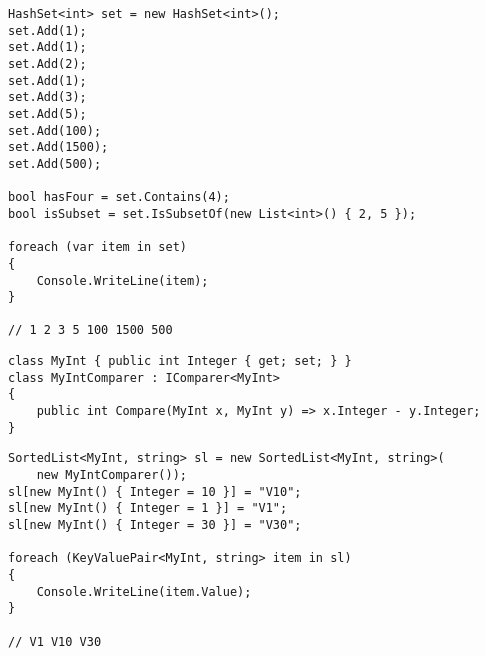 \begin{frame}[fragile]
\begin{yesblock}
\begin{lstlisting}[deletekeywords={set}]
HashSet<int> set = new HashSet<int>();
set.Add(1);
set.Add(1);
set.Add(2);
set.Add(1);
set.Add(3);
set.Add(5);
set.Add(100);
set.Add(1500);
set.Add(500);

bool hasFour = set.Contains(4);
bool isSubset = set.IsSubsetOf(new List<int>() { 2, 5 });

foreach (var item in set)
{
    Console.WriteLine(item);
}

// 1 2 3 5 100 1500 500
\end{lstlisting}
\end{yesblock}
\end{frame}


\begin{frame}[fragile]
\begin{yesblock}
\begin{lstlisting}
class MyInt { public int Integer { get; set; } }
class MyIntComparer : IComparer<MyInt>
{
    public int Compare(MyInt x, MyInt y) => x.Integer - y.Integer;
}
\end{lstlisting}
\end{yesblock}
\vfill
\begin{yesblock}
\begin{lstlisting}
SortedList<MyInt, string> sl = new SortedList<MyInt, string>(
    new MyIntComparer());
sl[new MyInt() { Integer = 10 }] = "V10";
sl[new MyInt() { Integer = 1 }] = "V1";
sl[new MyInt() { Integer = 30 }] = "V30";

foreach (KeyValuePair<MyInt, string> item in sl)
{
    Console.WriteLine(item.Value);
}

// V1 V10 V30
\end{lstlisting}
\end{yesblock}
\end{frame}

